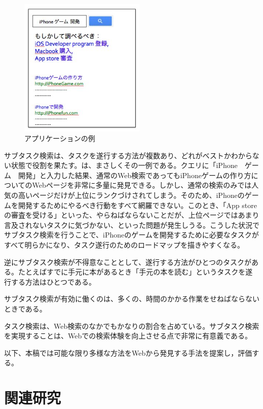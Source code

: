 \documentclass[submit,techreq]{ipsj}
\begin{document}
\begin{figure}[tb]
\includegraphics[width=6cm, bb=0 0 240 400]{future_app.jpg}
\caption{アプリケーションの例}
\label{fig:future_app}
\end{figure}

サブタスク検索は、タスクを遂行する方法が複数あり、どれがベストかわからない状態で役割を果たす。は、まさしくその一例である。クエリに「iPhone　ゲーム　開発」と入力した結果、通常のWeb検索であってもiPhoneゲームの作り方についてのWebページを非常に多量に発見できる。しかし、通常の検索のみでは人気の高いページだけが上位にランクづけされてしまう。そのため、iPhoneのゲームを開発するためにやるべき行動をすべて網羅できない。このとき、「App storeの審査を受ける」といった、やらねばならないことだが、上位ページではあまり言及されないタスクに気づかない、といった問題が発生しうる。こうした状況でサブタスク検索を行うことで、iPhoneのゲームを開発するために必要なタスクがすべて明らかになり、タスク遂行のためのロードマップを描きやすくなる。

逆にサブタスク検索が不得意なこととして、遂行する方法がひとつのタスクがある。たとえばすでに手元に本があるとき「手元の本を読む」というタスクを遂行する方法はひとつである。

サブタスク検索が有効に働くのは、多くの、時間のかかる作業をせねばならないときである。


タスク検索は、Web検索のなかでもかなりの割合を占めている。サブタスク検索を実現することは、Webでの検索体験を向上させる点で非常に有意義である。

以下、本稿では可能な限り多様な方法をWebから発見する手法を提案し，評価する。


\section{関連研究}
\end{document}
